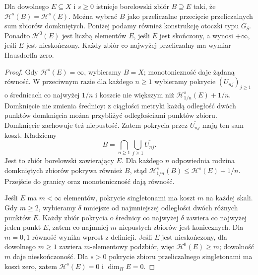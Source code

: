 \begin{twierdzenie}
\label{it:thm:hausdorff-borel-hull-zero}
Dla dowolnego $E\subseteq X$ i $s\ge0$ istnieje borelowski
zbiór $B\supseteq E$ taki, że $\mathcal H^s(B)=\mathcal H^s(E)$.
Można wybrać $B$ jako przeliczalne przecięcie przeliczalnych
sum zbiorów domkniętych. Poniżej podamy również konstrukcję
otoczki typu $G_\delta$. Ponadto $\mathcal H^0(E)$ jest
liczbą elementów $E$, jeśli $E$ jest skończony, a wynosi
$+\infty$, jeśli $E$ jest nieskończony.
Każdy zbiór co najwyżej przeliczalny ma wymiar Hausdorffa zero.
\end{twierdzenie}
\begin{proof}
Gdy $\mathcal H^s(E)=\infty$, wybieramy $B=X$;
monotoniczność daje żądaną równość. W przeciwnym
razie dla każdego $n\ge1$ wybieramy pokrycie $(U_{nj})_{j\ge1}$
o średnicach co najwyżej $1/n$ i koszcie nie większym
niż $\mathcal H^s_{1/n}(E)+1/n$.
Domknięcie nie zmienia średnicy: z ciągłości metryki
każdą odległość dwóch punktów domknięcia można
przybliżyć odległościami punktów zbioru.
Domknięcie zachowuje też niepustość.
Zatem pokrycia przez $\overline{U_{nj}}$ mają ten sam koszt.
Kładziemy
\[
 B=\bigcap_{n\ge1}\bigcup_{j\ge1}\overline{U_{nj}}.
\]
Jest to zbiór borelowski zawierający $E$.
Dla każdego $n$ odpowiednia rodzina domkniętych zbiorów
pokrywa również $B$, stąd
$\mathcal H^s_{1/n}(B)\le\mathcal H^s(E)+1/n$.
Przejście do granicy oraz monotoniczność dają równość.

Jeśli $E$ ma $m<\infty$ elementów, pokrycie singletonami
ma koszt $m$ na każdej skali. Gdy $m\ge2$, wybieramy
$\delta$ mniejsze od najmniejszej odległości dwóch różnych
punktów $E$. Każdy zbiór pokrycia o średnicy co najwyżej
$\delta$ zawiera co najwyżej jeden punkt $E$, zatem
co najmniej $m$ niepustych zbiorów jest koniecznych.
Dla $m=0,1$ równość wynika wprost z definicji.
Jeśli $E$ jest nieskończony, dla dowolnego $m\ge1$
zawiera $m$-elementowy podzbiór, więc
$\mathcal H^0(E)\ge m$; dowolność $m$ daje nieskończoność.
Dla $s>0$ pokrycie zbioru przeliczalnego singletonami
ma koszt zero, zatem $\mathcal H^s(E)=0$ i $\dim_HE=0$.
\end{proof}

